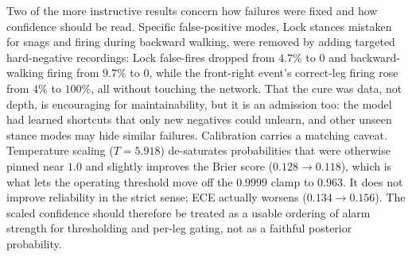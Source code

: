 Two of the more instructive results concern how failures were fixed and how confidence should be read. Specific false-positive modes, Lock stances mistaken for snags and firing during backward walking, were removed by adding targeted hard-negative recordings: Lock false-fires dropped from $4.7\%$ to $0$ and backward-walking firing from $9.7\%$ to $0$, while the front-right event's correct-leg firing rose from $4\%$ to $100\%$, all without touching the network. That the cure was data, not depth, is encouraging for maintainability, but it is an admission too: the model had learned shortcuts that only new negatives could unlearn, and other unseen stance modes may hide similar failures. Calibration carries a matching caveat. Temperature scaling ($T=5.918$) de-saturates probabilities that were otherwise pinned near $1.0$ and slightly improves the Brier score ($0.128\rightarrow0.118$), which is what lets the operating threshold move off the $0.9999$ clamp to $0.963$. It does not improve reliability in the strict sense; ECE actually worsens ($0.134\rightarrow0.156$). The scaled confidence should therefore be treated as a usable ordering of alarm strength for thresholding and per-leg gating, not as a faithful posterior probability.